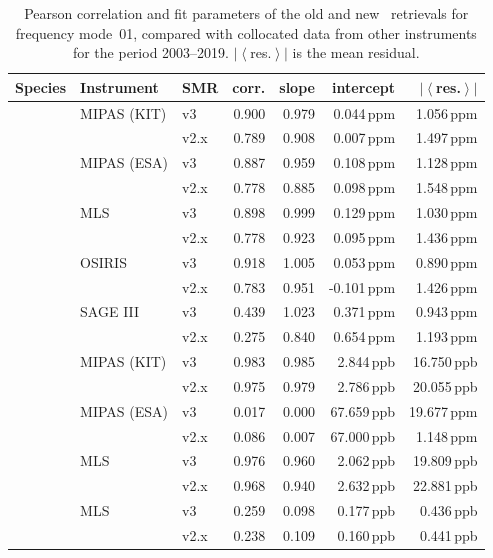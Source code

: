 \begin{table}[tbhp]
\centering
\caption{Pearson correlation and fit parameters of the old and new \smr\
retrievals for frequency mode~01, compared with collocated data from other
instruments for the period 2003--2019.
$\left|\left<\right.\right.$res.$\left.\left.\right>\right|$ is the mean
residual.}
\label{tab:fm01:stats}
\begin{tabular}{lllrrrr}
    \toprule
    \textbf{Species} & \textbf{Instrument} & \textbf{SMR} & \textbf{corr.} & \textbf{slope} & \textbf{intercept} & \textbf{$\left|\left<\right.\right.$res.$\left.\left.\right>\right|$} \\
    \midrule
    \chem{O3}   & MIPAS (KIT)   & v3    & 0.900 & 0.979 & 0.044\,ppm    &  1.056\,ppm \\
                &               & v2.x  & 0.789 & 0.908 & 0.007\,ppm    &  1.497\,ppm \\
    \cline{2-7}
                & MIPAS (ESA)   & v3    & 0.887 & 0.959 & 0.108\,ppm    &  1.128\,ppm \\
                &               & v2.x  & 0.778 & 0.885 & 0.098\,ppm    &  1.548\,ppm \\
    \cline{2-7}
                & MLS           & v3    & 0.898 & 0.999 & 0.129\,ppm    &  1.030\,ppm \\
                &               & v2.x  & 0.778 & 0.923 & 0.095\,ppm    &  1.436\,ppm \\
    \cline{2-7}
                & OSIRIS        & v3    & 0.918 & 1.005 &  0.053\,ppm   &  0.890\,ppm \\
                &               & v2.x  & 0.783 & 0.951 & -0.101\,ppm   &  1.426\,ppm \\
    \cline{2-7}
                & SAGE III      & v3    & 0.439 & 1.023 & 0.371\,ppm    &  0.943\,ppm \\
                &               & v2.x  & 0.275 & 0.840 & 0.654\,ppm    &  1.193\,ppm \\
    \midrule
    \chem{N_2O} & MIPAS (KIT)   & v3    & 0.983 & 0.985 & 2.844\,ppb    & 16.750\,ppb \\
                &               & v2.x  & 0.975 & 0.979 & 2.786\,ppb    & 20.055\,ppb \\
    \cline{2-7}
                & MIPAS (ESA)   & v3    & 0.017 & 0.000 & 67.659\,ppb   & 19.677\,ppm \\
                &               & v2.x  & 0.086 & 0.007 & 67.000\,ppb   &  1.148\,ppm \\
    \cline{2-7}
                & MLS           & v3    & 0.976 & 0.960 & 2.062\,ppb    & 19.809\,ppb \\
                &               & v2.x  & 0.968 & 0.940 & 2.632\,ppb    & 22.881\,ppb \\
    \midrule
    \chem{ClO}  & MLS           & v3    & 0.259 & 0.098 & 0.177\,ppb    &  0.436\,ppb \\
                &               & v2.x  & 0.238 & 0.109 & 0.160\,ppb    &  0.441\,ppb \\
    \bottomrule
\end{tabular}
\end{table}


